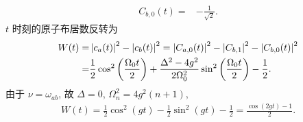 \documentclass{assignment}
\begin{document}
\begin{sol}
\begin{itemize}
\begin{align}
            C_{b,0}(t)=&-\frac{1}{\sqrt{2}}.
        \end{align}
        $t$ 时刻的原子布居数反转为
        \begin{align}
            \notag W(t)=&\left\lvert c_a(t)\right\rvert^2-\left\lvert c_b(t)\right\rvert^2=\left\lvert C_{a,0}(t)\right\rvert^2-\left\lvert C_{b,1}\right\rvert^2-\left\lvert C_{b,0}(t)\right\rvert^2\\
            =&\frac{1}{2}\cos^2\left(\frac{\Omega_0t}{2}\right)+\frac{\Delta^2-4g^2}{2\Omega_0^2}\sin^2\left(\frac{\Omega_0t}{2}\right)-\frac{1}{2}.
        \end{align}
        由于 $\nu=\omega_{ab}$, 故 $\Delta=0$, $\Omega_n^2=4g^2(n+1)$,
        \begin{align}
            W(t)=\frac{1}{2}\cos^2(gt)-\frac{1}{2}\sin^2(gt)-\frac{1}{2}=\frac{\cos(2gt)-1}{2}.
        \end{align}
    \end{itemize}
\end{sol}
\end{document}
